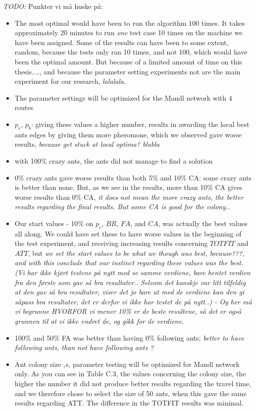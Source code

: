 \emph{\color{blue} TODO:}
Punkter vi må huske på:
\begin{itemize}
\item The most optimal would have been to run the algorithm 100 times. It takes approximately 20 minutes to run \textit{one} test case 10 times on the machine we have been assigned. %
Some of the results can have been to some extent, random, because the tests only ran 10 times, and not 100, which would have been the optimal amount. But because of a limited amount of time on this thesis...., and because the parameter setting experiments not are the main experiment for our research, \emph{\color{blue} lalalala}. 
\item The parameter settings will be optimized for the Mandl network with 4 routes
\item $p_v$, $p_b$: giving these values a higher number, results in awarding the local best ants edges by giving them more pheromone, which we observed gave worse results, \emph{\color{blue}because get stuck at local optima? blabla}
\item with 100\% crazy ants, the ants did not manage to find a solution 
\item 0\% crazy ants gave worse results than both 5\% and 10\% CA: some crazy ants is better than none. But, as we see in the results, more than 10\% CA gives worse results than 0\% CA, \emph{\color{blue} it does not mean the more crazy ants, the better results regarding the final results. But some CA is good for the colony..}
\item Our start values - 10\% on $p_e$, $BR$, $FA$, and $CA$, was actually the best values all along. We could have set these to have worse values in the beginning of the test experiment, and receiving increasing results concerning $TOTFIT$ and $ATT$, but \emph{\color{blue} we set the start values to be what we though was best, because???, and with this conclude that our instinct regarding these values was the best. (Vi har ikke kjørt testene på nytt med se samme verdiene, bare hentet verdien fra den første som gav så bra resultater.. Selvom det kanskje var litt tilfeldig at den gav så bra resultater, viser det jo bare at med de verdiene kan den gi såpass bra resultater, det er derfor vi ikke har testet de på nytt..) - Og her må vi begrunne HVORFOR vi mener 10\% er de beste resultene, så det er også grunnen til at vi ikke endret de, og gikk for de verdiene.}
\item 100\% and 50\% FA was better than having 0\% following ants; \emph{\color{blue}better to have following ants, than not have following ants ?}
\item Ant colony size ,$s$, parameter testing will be optimized for Mandl network only. As you can see in Table C.3, the values concerning the colony size, the higher the number it did not produce better results regarding the travel time, and we therefore chose to select the size of 50 ants, when this gave the same results regarding ATT. The difference in the TOTFIT results was minimal.
\end{itemize}

